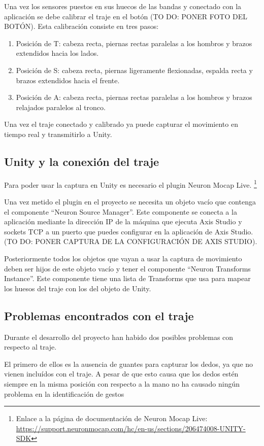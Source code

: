 Una vez los sensores puestos en sus huecos de las bandas y conectado con la aplicación se debe calibrar el traje en el botón (TO DO: PONER FOTO DEL BOTÓN).
Esta calibración consiste en tres pasos:
\begin{enumerate}
    \item Posición de T: cabeza recta, piernas rectas paralelas a los hombros y brazos extendidos hacia los lados.
    \item Posición de S: cabeza recta, piernas ligeramente flexionadas, espalda recta y brazos extendidos hacia el frente.
    \item Posición de A: cabeza recta, piernas rectas paralelas a los hombros y brazos relajados paralelos al tronco.
\end{enumerate}

Una vez el traje conectado y calibrado ya puede capturar el movimiento en tiempo real y transmitirlo a Unity.
\subsection{Unity y la conexión del traje}
\label{subsec:NeuronMocapLive}
Para poder usar la captura en Unity es necesario el plugin Neuron Mocap Live. \footnote{Enlace a la página de documentación de Neuron Mocap Live: \url{https://support.neuronmocap.com/hc/en-us/sections/206474008-UNITY-SDK}}

Una vez metido el plugin en el proyecto se necesita un objeto vacío que contenga el componente ``Neuron Source Manager''.
Este componente se conecta a la aplicación mediante la dirección IP de la máquina que ejecuta Axis Studio y sockets TCP a un puerto que puedes configurar en la aplicación de Axis Studio. (TO DO: PONER CAPTURA DE LA CONFIGURACIÓN DE AXIS STUDIO).

Posteriormente todos los objetos que vayan a usar la captura de movimiento deben ser hijos de este objeto vacío y tener el componente ``Neuron Transforms Instance''.
Este componente tiene una lista de Transforms que usa para mapear los huesos del traje con los del objeto de Unity.

\subsection{Problemas encontrados con el traje}
Durante el desarrollo del proyecto han habido dos posibles problemas con respecto al traje.

El primero de ellos es la ausencia de guantes para capturar los dedos, ya que no vienen incluídos con el traje.
A pesar de que esto causa que los dedos estén siempre en la misma posición con respecto a la mano no ha causado ningún problema en la identificación de gestos


